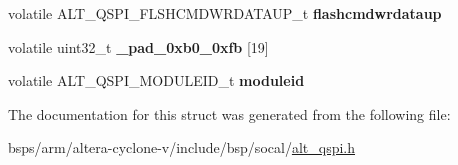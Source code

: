 \begin{DoxyCompactItemize}
\item 
\mbox{\label{structALT__QSPI__s_ae2ebc7491c60e7d6115619485d3ec94f}} 
volatile A\+L\+T\+\_\+\+Q\+S\+P\+I\+\_\+\+F\+L\+S\+H\+C\+M\+D\+W\+R\+D\+A\+T\+A\+U\+P\+\_\+t {\bfseries flashcmdwrdataup}
\item 
\mbox{\label{structALT__QSPI__s_a2fb54ae19ad0ece66b2b806f319dab41}} 
volatile uint32\+\_\+t {\bfseries \+\_\+pad\+\_\+0xb0\+\_\+0xfb} \mbox{[}19\mbox{]}
\item 
\mbox{\label{structALT__QSPI__s_a70ac37821d8a63136546fc1fd4de8aff}} 
volatile A\+L\+T\+\_\+\+Q\+S\+P\+I\+\_\+\+M\+O\+D\+U\+L\+E\+I\+D\+\_\+t {\bfseries moduleid}
\end{DoxyCompactItemize}


The documentation for this struct was generated from the following file\+:\begin{DoxyCompactItemize}
\item 
bsps/arm/altera-\/cyclone-\/v/include/bsp/socal/\mbox{\hyperlink{include_2bsp_2socal_2alt__qspi_8h}{alt\+\_\+qspi.\+h}}\end{DoxyCompactItemize}
